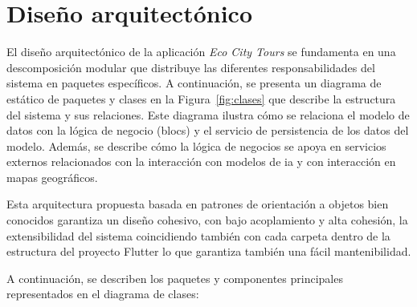\section{Diseño arquitectónico}

El diseño arquitectónico de la aplicación \textit{Eco City Tours} se fundamenta en una descomposición modular que distribuye las diferentes responsabilidades del sistema en paquetes específicos. A continuación, se presenta un diagrama de estático de paquetes y clases en la Figura~\ref{fig:clases} que describe la estructura del sistema y sus relaciones. Este diagrama ilustra cómo se relaciona el modelo de datos con la lógica de negocio (blocs) y el servicio de persistencia de los datos del modelo. Además, se describe cómo la lógica de negocios se apoya en servicios externos relacionados con la interacción con modelos de \acrshort{ia} y con interacción en mapas geográficos.

Esta arquitectura propuesta basada en patrones de orientación a objetos bien conocidos\cite{gamma2002patrones} garantiza un diseño cohesivo, con bajo acoplamiento y alta cohesión, la extensibilidad del sistema coincidiendo también con cada carpeta dentro de la estructura del proyecto Flutter lo que garantiza también una fácil mantenibilidad.


A continuación, se describen los paquetes y componentes principales representados en el diagrama de clases:

